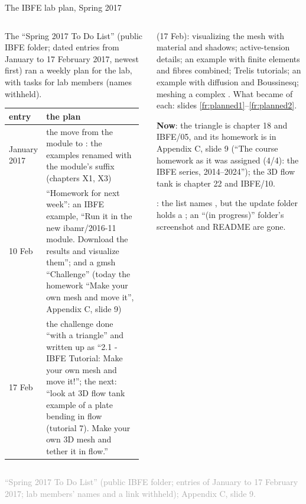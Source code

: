 \documentclass[aspectratio=169,11pt]{beamer}
\newcommand{\sourcecredit}[1]{\vfill\begin{flushright}\tiny\textcolor{DarkGray}{#1}\end{flushright}}
\begin{document}
\begin{frame}{The IBFE lab plan, Spring 2017}
\label{fr:ibfeplan}
\begin{columns}[T,onlytextwidth]
\begin{column}{0.56\textwidth}
\footnotesize The ``Spring 2017 To Do List'' (public IBFE folder; dated entries from January to 17 February 2017, newest first) ran a weekly plan for the lab, with tasks for lab members (names withheld).

\vspace{1mm}
\scriptsize
\renewcommand{\arraystretch}{1.15}
\setlength{\tabcolsep}{3pt}
\begin{tabular}{@{}L{0.17\linewidth}L{0.79\linewidth}@{}}
\toprule
entry & the plan \\
\midrule
January 2017 & the move from the module  to : the examples renamed with the module's suffix (chapters X1, X3) \\
10 Feb & ``Homework for next week'': an IBFE example, ``Run it in the new ibamr/2016-11 module. Download the results and visualize them''; and a gmsh ``Challenge'' (today the homework ``Make your own mesh and move it'', Appendix C, slide 9) \\
17 Feb & the challenge done ``with a triangle'' and written up as ``2.1 - IBFE Tutorial: Make your own mesh and move it!''; the next: ``look at 3D flow tank example of a plate bending in flow (tutorial 7). Make your own 3D mesh and tether it in flow.'' \\
\bottomrule
\end{tabular}
\end{column}
\begin{column}{0.41\textwidth}
\scriptsize
{} (17 Feb): visualizing the mesh with material and shadows; active-tension details; an example with finite elements and fibres combined; Trelis tutorials; an example with diffusion and Boussinesq; meshing a complex . What became of each: slides \ref{fr:planned1}--\ref{fr:planned2}.

\begin{homebox}
\scriptsize \textbf{Now}: the triangle is chapter 18 and IBFE/05, and its homework is in Appendix C, slide 9 (``The course homework as it was assigned (4/4): the IBFE series, 2014--2024''); the 3D flow tank is chapter 22 and IBFE/10.
\end{homebox}
\vspace{1mm}
: the list names , but the update folder holds a ; an ``(in progress)'' folder's screenshot and README are gone.
\end{column}
\end{columns}
\sourcecredit{``Spring 2017 To Do List'' (public IBFE folder; entries of January to 17 February 2017; lab members' names and a link withheld); Appendix C, slide 9.}
\end{frame}
\end{document}
